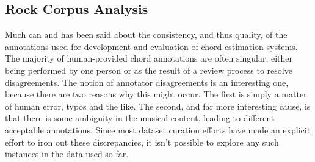 \subsection{Rock Corpus Analysis}
\label{subsec:qualitative_analysis}

Much can and has been said about the consistency, and thus quality, of the annotations used for development and evaluation of chord estimation systems.
The majority of human-provided chord annotations are often singular, either being performed by one person or as the result of a review process to resolve disagreements.
The notion of annotator disagreements is an interesting one, because there are two reasons why this might occur.
The first is simply a matter of human error, typos and the like.
The second, and far more interesting cause, is that there is some ambiguity in the musical content, leading to different acceptable annotations.
Since most dataset curation efforts have made an explicit effort to iron out these discrepancies, it isn't possible to explore any such instances in the data used so far.








